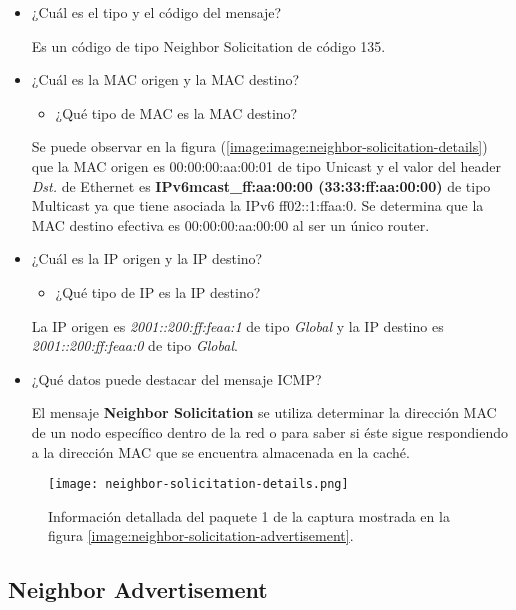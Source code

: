 \documentclass[osajnl,twocolumn,showpacs,superscriptaddress,10pt]{revtex4-1} %
\begin{document}
\begin{itemize}
    \item ¿Cuál es el tipo y el código del mensaje?
    
    Es un código de tipo Neighbor Solicitation de código 135.

    \item ¿Cuál es la MAC origen y la MAC destino?
    
    \begin{itemize}
        \item ¿Qué tipo de MAC es la MAC destino?
    \end{itemize}

    Se puede observar en la figura (\ref{image:image:neighbor-solicitation-details}) que la MAC origen es 00:00:00:aa:00:01 de tipo Unicast y el valor del header \textit{Dst.} de Ethernet
    es \textbf{IPv6mcast\_ff:aa:00:00 (33:33:ff:aa:00:00)} de tipo Multicast ya que tiene asociada la IPv6 ff02::1:ffaa:0. Se determina que la MAC destino efectiva es 00:00:00:aa:00:00 al ser un único router.
    
    \item ¿Cuál es la IP origen y la IP destino?
    
    \begin{itemize}
        \item ¿Qué tipo de IP es la IP destino?
    \end{itemize}

    La IP origen es \textit{2001::200:ff:feaa:1} de tipo \textit{Global} y la IP destino es \textit{2001::200:ff:feaa:0} de tipo \textit{Global}.
    
    \item ¿Qué datos puede destacar del mensaje ICMP?
    
    El mensaje \textbf{Neighbor Solicitation} se utiliza determinar la dirección MAC de un nodo específico dentro de la red o para saber si éste sigue respondiendo a la dirección MAC que se encuentra almacenada en la caché.
\end{itemize}

\begin{figure}[H]
    \centering
    \texttt{[image: neighbor-solicitation-details.png]}
    \caption{Información detallada del paquete 1 de la captura mostrada en la figura \ref{image:neighbor-solicitation-advertisement}.}
    \label{image:neighbor-solicitation-details}
\end{figure}

\subsection{Neighbor Advertisement}
\end{document}

